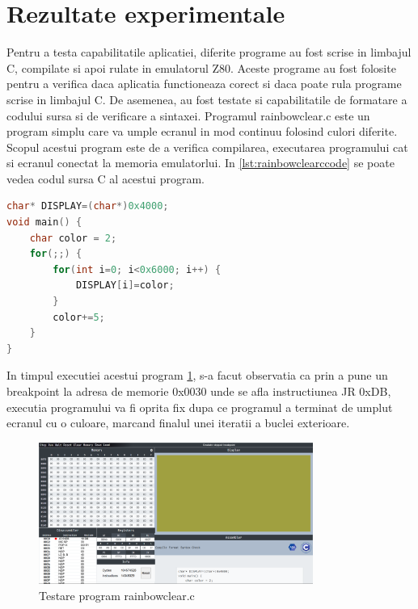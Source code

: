 \documentclass[titlepage,12pt]{article}
\DeclareRobustCommand{\code}[1]{{\ttfamily\small #1}}
\begin{document}
\clearpage
\section{Rezultate experimentale}
Pentru a testa capabilitatile aplicatiei, diferite programe au fost scrise in limbajul C, compilate si apoi rulate in emulatorul Z80. Aceste programe au fost folosite pentru a verifica daca aplicatia functioneaza corect si daca poate rula programe scrise in limbajul C. De asemenea, au fost testate si capabilitatile de formatare a codului sursa si de verificare a sintaxei.
Programul \code{rainbowclear.c} este un program simplu care va umple ecranul in mod continuu folosind culori diferite. Scopul acestui program este de a verifica compilarea, executarea programului cat si ecranul conectat la memoria emulatorlui. In \cref{lst:rainbowclearccode} se poate vedea codul sursa C al acestui program.

\begin{lstlisting}[language=C,caption={Cod sursa C pentru \code{rainbowclear.c}},label={lst:rainbowclearccode}]
char* DISPLAY=(char*)0x4000;
void main() {
    char color = 2;
    for(;;) {
        for(int i=0; i<0x6000; i++) {
            DISPLAY[i]=color;
        }
        color+=5;
    }
}
\end{lstlisting}

In timpul executiei acestui program \cref{fig:rainbowtestrun}, s-a facut observatia ca prin a pune un breakpoint la adresa de memorie \code{0x0030} unde se afla instructiunea \code{JR 0xDB}, executia programului va fi oprita fix dupa ce programul a terminat de umplut ecranul cu o culoare, marcand finalul unei iteratii a buclei exterioare.

\begin{figure}[H]
    \centering
    \includegraphics[width=0.8\textwidth]{images/rainbowtestrun.png}
    \caption{Testare program \code{rainbowclear.c}}
    \label{fig:rainbowtestrun}
\end{figure}
\end{document}
